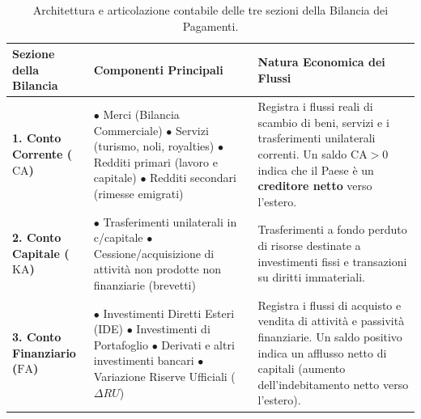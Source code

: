\begin{table}[htbp]
\centering
\small
\renewcommand{\arraystretch}{1.35}
\begin{tabularx}{\textwidth}{l p{4.5cm} X}
\toprule
\textbf{Sezione della Bilancia} & \textbf{Componenti Principali} & \textbf{Natura Economica dei Flussi} \\
\midrule
\textbf{1. Conto Corrente ($\mathrm{CA}$)} & 
$\bullet$ Merci (Bilancia Commerciale)\newline
$\bullet$ Servizi (turismo, noli, royalties)\newline
$\bullet$ Redditi primari (lavoro e capitale)\newline
$\bullet$ Redditi secondari (rimesse emigrati) & 
Registra i flussi reali di scambio di beni, servizi e i trasferimenti unilaterali correnti. Un saldo $\mathrm{CA} > 0$ indica che il Paese è un \textbf{creditore netto} verso l'estero. \\
\midrule
\textbf{2. Conto Capitale ($\mathrm{KA}$)} & 
$\bullet$ Trasferimenti unilaterali in c/capitale\newline
$\bullet$ Cessione/acquisizione di attività non prodotte non finanziarie (brevetti) & 
Trasferimenti a fondo perduto di risorse destinate a investimenti fissi e transazioni su diritti immateriali. \\
\midrule
\textbf{3. Conto Finanziario ($\mathrm{FA}$)} & 
$\bullet$ Investimenti Diretti Esteri (IDE)\newline
$\bullet$ Investimenti di Portafoglio\newline
$\bullet$ Derivati e altri investimenti bancari\newline
$\bullet$ Variazione Riserve Ufficiali ($\Delta RU$) & 
Registra i flussi di acquisto e vendita di attività e passività finanziarie. Un saldo positivo indica un afflusso netto di capitali (aumento dell'indebitamento netto verso l'estero). \\
\bottomrule
\end{tabularx}
\caption{Architettura e articolazione contabile delle tre sezioni della Bilancia dei Pagamenti.}
\label{tab:struttura_bp}
\end{table}

